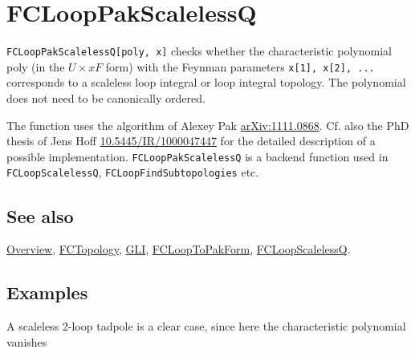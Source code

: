 \documentclass[../FeynCalcManual.tex]{subfiles}
\begin{document}
\hypertarget{fclooppakscalelessq}{%
\section{FCLoopPakScalelessQ}\label{fclooppakscalelessq}}

\texttt{FCLoopPakScalelessQ[\allowbreak{}poly,\ \allowbreak{}x]} checks
whether the characteristic polynomial poly (in the \(U \times xF\) form)
with the Feynman parameters
\texttt{x[\allowbreak{}1],\ \allowbreak{}x[\allowbreak{}2],\ \allowbreak{}...}
corresponds to a scaleless loop integral or loop integral topology. The
polynomial does not need to be canonically ordered.

The function uses the algorithm of Alexey Pak
\href{https://arxiv.org/abs/1111.0868}{arXiv:1111.0868}. Cf. also the
PhD thesis of Jens Hoff
\href{https://doi.org/10.5445/IR/1000047447}{10.5445/IR/1000047447} for
the detailed description of a possible implementation.
\texttt{FCLoopPakScalelessQ} is a backend function used in
\texttt{FCLoopScalelessQ}, \texttt{FCLoopFindSubtopologies} etc.

\subsection{See also}

\hyperlink{toc}{Overview}, \hyperlink{fctopology}{FCTopology},
\hyperlink{gli}{GLI}, \hyperlink{fclooptopakform}{FCLoopToPakForm},
\hyperlink{fcloopscalelessq}{FCLoopScalelessQ}.

\subsection{Examples}

A scaleless 2-loop tadpole is a clear case, since here the
characteristic polynomial vanishes

\begin{Shaded}
\begin{Highlighting}[]
\ExtensionTok{=}\OperatorTok{[}\OperatorTok{,}\OperatorTok{,}\SpecialCharTok{{-}}\OperatorTok{]} 
 
\ExtensionTok{=}\OperatorTok{[}\OperatorTok{,} \OperatorTok{\{}\OperatorTok{,}\OperatorTok{\},}  \OtherTok{{-}\textgreater{}} \OperatorTok{,} 
     
      \OtherTok{{-}\textgreater{}} \OperatorTok{[\{}\OperatorTok{,} \OperatorTok{\},}  \OperatorTok{]][[}\OperatorTok{]][[}\OperatorTok{]]}
\end{Highlighting}
\end{Shaded}
\end{document}
